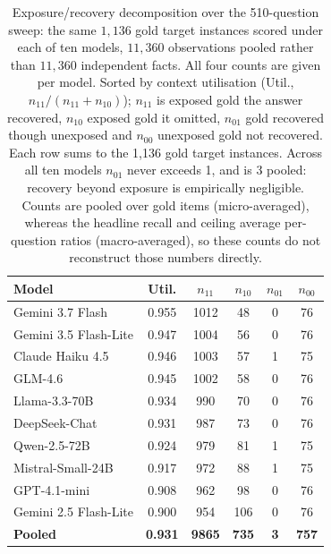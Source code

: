 \documentclass[10pt,twocolumn]{article}
\begin{document}
\begin{table}[tb]\centering\footnotesize
\caption{Exposure/recovery decomposition over the 510-question sweep: the same $1{,}136$ gold target
instances scored under each of ten models, $11{,}360$ observations pooled rather than $11{,}360$ independent
facts. All four counts are given per model. Sorted by context utilisation (Util., $n_{11}/(n_{11}+n_{10})$); $n_{11}$ is exposed gold the answer recovered, $n_{10}$ exposed gold it omitted, $n_{01}$ gold recovered though unexposed and $n_{00}$ unexposed gold not recovered. Each row sums to the 1{,}136 gold target instances. Across all ten models $n_{01}$ never exceeds 1, and is 3 pooled: recovery beyond exposure is
empirically negligible. Counts are pooled over
gold items (micro-averaged), whereas the headline recall and ceiling average per-question ratios
(macro-averaged), so these counts do not reconstruct those numbers directly.}
\label{tab:decomp}
\setlength{\tabcolsep}{3.6pt}
\begin{tabular}{lccccc}
\toprule
Model & Util. & $n_{11}$ & $n_{10}$ & $n_{01}$ & $n_{00}$ \\
\midrule
Gemini 3.7 Flash      & 0.955 & 1012 & 48  & 0 & 76 \\
Gemini 3.5 Flash-Lite & 0.947 & 1004 & 56  & 0 & 76 \\
Claude Haiku 4.5      & 0.946 & 1003 & 57  & 1 & 75 \\
GLM-4.6               & 0.945 & 1002 & 58  & 0 & 76 \\
Llama-3.3-70B         & 0.934 &  990 & 70  & 0 & 76 \\
DeepSeek-Chat         & 0.931 &  987 & 73  & 0 & 76 \\
Qwen-2.5-72B          & 0.924 &  979 & 81  & 1 & 75 \\
Mistral-Small-24B     & 0.917 &  972 & 88  & 1 & 75 \\
GPT-4.1-mini          & 0.908 &  962 & 98  & 0 & 76 \\
Gemini 2.5 Flash-Lite & 0.900 &  954 & 106 & 0 & 76 \\
\midrule
\textbf{Pooled}       & \textbf{0.931} & \textbf{9865} & \textbf{735} & \textbf{3} & \textbf{757} \\
\bottomrule
\end{tabular}
\end{table}
\end{document}

